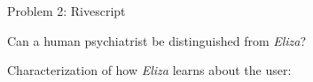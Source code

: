 \documentclass[12pt,a4paper]{article}
\begin{document}
{
\begin{center}
\begin{Large}
Problem 2: Rivescript
\end{Large}
\end{center}
Can a human psychiatrist be distinguished from \textit{Eliza}?


Characterization of how \textit{Eliza} learns about the user:

}
\end{document}
